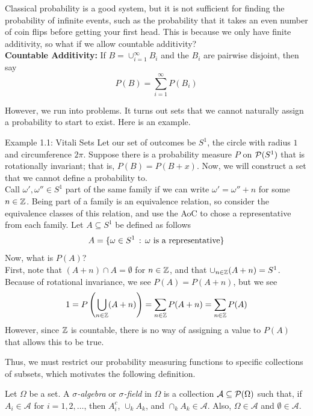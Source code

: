 
Classical probability is a good system, but it is not sufficient for finding the probability of infinite events, such as the probability that it takes an even number of coin flips before getting your first head. This is because we only have finite additivity, so what if we allow countable additivity?\\

\textbf{Countable Additivity:} If $B = \cup_{i = 1}^{\infty} B_{i}$ and the $B_{i}$ are pairwise disjoint, then say
\[ P(B) = \sum_{i = 1}^{\infty} P(B_{i}) \]

However, we run into problems. It turns out sets that we cannot naturally assign a probability to start to exist. Here is an example.\\

\begin{example}{Example 1.1: Vitali Sets}
    Let our set of outcomes be $S^1$, the circle with radius $1$ and circumference $2\pi$. Suppose there is a probability measure $P$ on $\P(S^1)$ that is rotationally invariant; that is, $P(B) = P(B + x)$. Now, we will construct a set that we cannot define a probability to.\\

    Call $\omega', \omega'' \in S^1$ part of the same family if we can write $\omega' = \omega'' + n$ for some $n \in \Z$. Being part of a family is an equivalence relation, so consider the equivalence classes of this relation, and use the AoC to chose a representative from each family. Let $A \subseteq S^1$ be defined as follows
    \[ A = \{\omega \in S^1 \col \omega \text{ is a representative}\} \]
    Now, what is $P(A)$?\\

    First, note that $(A + n) \cap A = \emptyset$ for $n \in \Z$, and that $\cup_{n \in \Z}(A + n) = S^1$. Because of rotational invariance, we see $P(A) = P(A + n)$, but we see
    \[ 1 = P\left(\bigcup_{n \in \Z}(A + n)\right) = \sum_{n \in \Z} P(A + n) = \sum_{n \in \Z} P(A) \]
    However, since $\Z$ is countable, there is no way of assigning a value to $P(A)$ that allows this to be true. 
\end{example}

Thus, we must restrict our probability measuring functions to specific collections of subsets, which motivates the following definition.


\begin{definition}
    Let $\Omega$ be a set. A \emph{$\sigma$-algebra} or \emph{$\sigma$-field} in $\Omega$ is a collection $\mathcal{A} \subseteq \P(\Omega)$ such that, if $A_{i} \in \mathcal{A}$ for $i = 1, 2, \ldots$, then $A_{i}^{c}$, $\cup_{k} A_{k}$, and $\cap_{k} A_{k} \in \mathcal{A}$. Also, $\Omega \in \mathcal{A}$ and $\emptyset \in \mathcal{A}$.
\end{definition}

